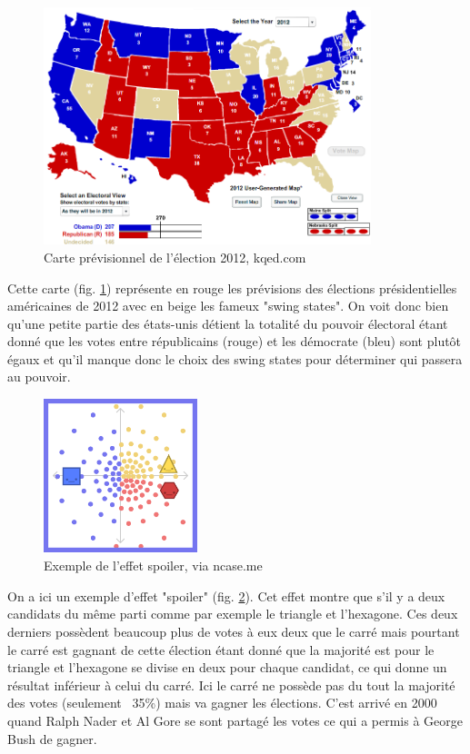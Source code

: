 \documentclass[12pt,a4paper]{report}
\begin{document}
\begin{figure}[h]
	\centering
	\includegraphics[width=0.85\textwidth]{./images/2012-election.png}
	\caption{Carte prévisionnel de l'élection 2012, kqed.com \cite{kqed:map}}
	\label{map:uselec2012}
\end{figure}

Cette carte (fig. \ref{map:uselec2012}) représente en rouge les prévisions des élections présidentielles américaines de 2012 avec en beige les fameux "swing states".
On voit donc bien qu'une petite partie des états-unis détient la totalité du pouvoir électoral étant donné que les votes entre républicains (rouge) et les démocrate (bleu) sont plutôt égaux et qu'il manque donc le choix des swing states pour déterminer qui passera au pouvoir.

\begin{figure}[h]
	\centering
	\includegraphics[width=0.4\textwidth]{./images/spoiler-effect.png}
	\caption{Exemple de l'effet spoiler, via ncase.me \cite{ncase:ballot}}
	\label{sim:spoilereffect}
\end{figure}


On a ici un exemple d'effet "spoiler" (fig. \ref{sim:spoilereffect}).
Cet effet montre que s'il y a deux candidats du même parti comme par exemple le triangle et l'hexagone.
Ces deux derniers possèdent beaucoup plus de votes à eux deux que le carré mais pourtant le carré est gagnant de cette élection étant donné que la majorité est pour le triangle et l'hexagone se divise en deux pour chaque candidat, ce qui donne un résultat inférieur à celui du carré.
Ici le carré ne possède pas du tout la majorité des votes (seulement ~35\%) mais va gagner les élections.
C'est arrivé en 2000 quand Ralph Nader et Al Gore se sont partagé les votes ce qui a permis à George Bush de gagner.
\end{document}
